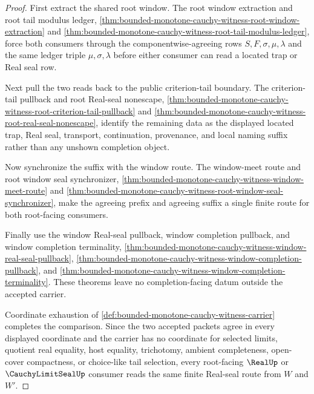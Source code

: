 \begin{proof}
First extract the shared root window. The root window extraction and root tail modulus ledger, \autoref{thm:bounded-monotone-cauchy-witness-root-window-extraction} and \autoref{thm:bounded-monotone-cauchy-witness-root-tail-modulus-ledger}, force both consumers through the componentwise-agreeing rows $S,F,\sigma,\mu,\lambda$ and the same ledger triple $\mu,\sigma,\lambda$ before either consumer can read a located trap or Real seal row.

Next pull the two reads back to the public criterion-tail boundary. The criterion-tail pullback and root Real-seal nonescape, \autoref{thm:bounded-monotone-cauchy-witness-root-criterion-tail-pullback} and \autoref{thm:bounded-monotone-cauchy-witness-root-real-seal-nonescape}, identify the remaining data as the displayed located trap, Real seal, transport, continuation, provenance, and local naming suffix rather than any unshown completion object.

Now synchronize the suffix with the window route. The window-meet route and root window seal synchronizer, \autoref{thm:bounded-monotone-cauchy-witness-window-meet-route} and \autoref{thm:bounded-monotone-cauchy-witness-root-window-seal-synchronizer}, make the agreeing prefix and agreeing suffix a single finite route for both root-facing consumers.

Finally use the window Real-seal pullback, window completion pullback, and window completion terminality, \autoref{thm:bounded-monotone-cauchy-witness-window-real-seal-pullback}, \autoref{thm:bounded-monotone-cauchy-witness-window-completion-pullback}, and \autoref{thm:bounded-monotone-cauchy-witness-window-completion-terminality}. These theorems leave no completion-facing datum outside the accepted carrier.

Coordinate exhaustion of \autoref{def:bounded-monotone-cauchy-witness-carrier} completes the comparison. Since the two accepted packets agree in every displayed coordinate and the carrier has no coordinate for selected limits, quotient real equality, host equality, trichotomy, ambient completeness, open-cover compactness, or choice-like tail selection, every root-facing $\RealUp$ or $\CauchyLimitSealUp$ consumer reads the same finite Real-seal route from $W$ and $W'$.
\end{proof}


